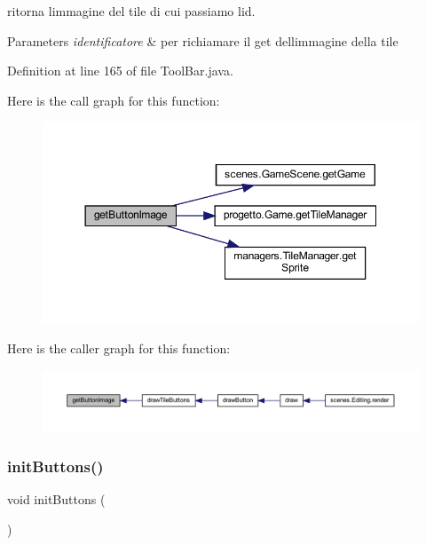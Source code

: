 ritorna l\textquotesingle{}immagine del tile di cui passiamo l\textquotesingle{}id. 


\begin{DoxyParams}{Parameters}
{\em identificatore} & per richiamare il get dell\textquotesingle{}immagine della tile \\
\hline
\end{DoxyParams}


Definition at line 165 of file Tool\+Bar.\+java.

Here is the call graph for this function\+:
\nopagebreak
\begin{figure}[H]
\begin{center}
\leavevmode
\includegraphics[width=350pt]{classui_1_1_tool_bar_abe2e2af5c0d57248464e8b607c41a36f_cgraph}
\end{center}
\end{figure}
Here is the caller graph for this function\+:\nopagebreak
\begin{figure}[H]
\begin{center}
\leavevmode
\includegraphics[width=350pt]{classui_1_1_tool_bar_abe2e2af5c0d57248464e8b607c41a36f_icgraph}
\end{center}
\end{figure}
\mbox{\label{classui_1_1_tool_bar_a27d3ba5afb772cc36c9a432c28975ace}} 
\subsubsection{\texorpdfstring{init\+Buttons()}{initButtons()}}
{\footnotesize\ttfamily void init\+Buttons (\begin{DoxyParamCaption}{ }\end{DoxyParamCaption})\hspace{0.3cm}{\ttfamily [private]}}



